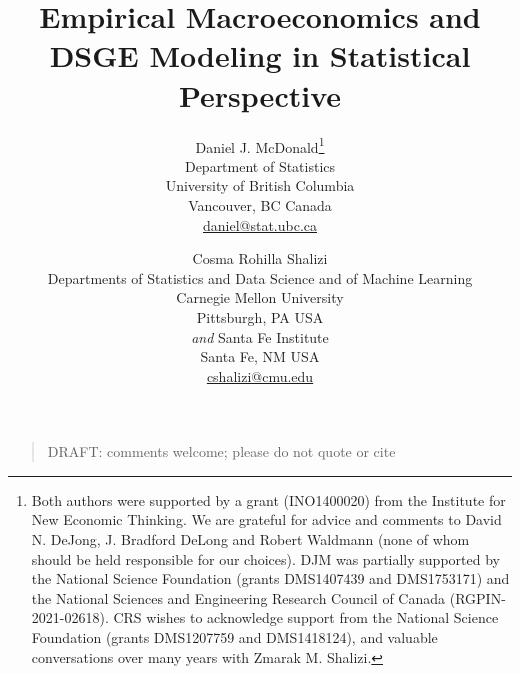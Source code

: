 \documentclass[11pt]{article}
\newcommand{\email}[1]{\href{mailto:#1}{#1}}
\begin{document}

\title{Empirical Macroeconomics and DSGE Modeling in Statistical
Perspective}
\author{  
    Daniel J. McDonald\thanks{Both authors were supported by a grant
(INO1400020) from the Institute for New Economic Thinking. We are
grateful for advice and comments to David N. DeJong, J. Bradford DeLong
and Robert Waldmann (none of whom should be held responsible for our
choices). DJM was partially supported by the National Science Foundation
(grants DMS1407439 and DMS1753171) and the National Sciences and
Engineering Research Council of Canada (RGPIN-2021-02618). CRS wishes to
acknowledge support from the National Science Foundation (grants
DMS1207759 and DMS1418124), and valuable conversations over many years
with Zmarak M. Shalizi.}  \\
  Department of Statistics\\
University of British Columbia\\
Vancouver, BC Canada\\
\email{daniel@stat.ubc.ca}  
   \and   Cosma Rohilla Shalizi \\
  Departments of Statistics and Data Science and of Machine Learning\\
Carnegie Mellon University\\
Pittsburgh, PA USA\\
\emph{and} Santa Fe Institute\\
Santa Fe, NM USA\\
\email{cshalizi@cmu.edu}  
  }
\date{}

\maketitle

\begin{quotation}
DRAFT: comments welcome; please do not quote or cite
\end{quotation}
\end{document}

